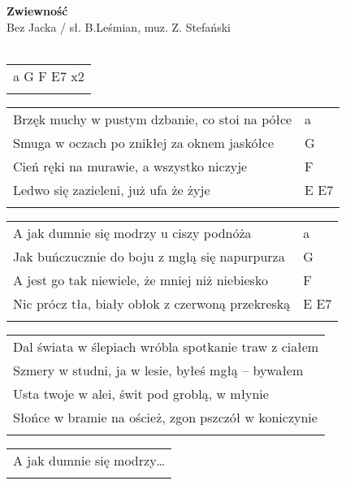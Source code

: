 \documentclass[a5paper]{article}
\begin{document}


\noindent
\fontsize{12pt}{15pt}\selectfont
\textbf{Zwiewność} \\
\fontsize{8pt}{10pt}\selectfont
Bez Jacka / sł. B.Leśmian, muz. Z. Stefański \\ \\
\fontsize{10pt}{12pt}\selectfont
{}
\begin{tabular}{@{}p{9.00cm}@{}}
\noindent
a G F E7 x2 \\ \\
\end{tabular}

\noindent
\begin{tabular}{@{}p{9.00cm}p{3cm}@{}}
Brzęk muchy w pustym dzbanie, co stoi na półce & a \\
Smuga w oczach po znikłej za oknem jaskółce & G \\
Cień ręki na murawie, a wszystko niczyje & F \\
Ledwo się zazieleni, już ufa że żyje & E E7 \\ \\
\end{tabular}

\noindent
\begin{tabular}{@{}p{8.00cm}p{3cm}@{}}
A jak dumnie się modrzy u ciszy podnóża & a \\
Jak buńczucznie do boju z mgłą się napurpurza & G \\
A jest go tak niewiele, że mniej niż niebiesko & F \\
Nic prócz tła, biały obłok z czerwoną przekreską & E E7 \\ \\
\end{tabular}

\noindent
\begin{tabular}{@{}p{9.00cm}@{}}
Dal świata w ślepiach wróbla spotkanie traw z ciałem \\
Szmery w studni, ja w lesie, byłeś mgłą – bywałem \\
Usta twoje w alei, świt pod groblą, w młynie \\
Słońce w bramie na oścież, zgon pszczół w koniczynie \\ \\
\end{tabular}

\noindent
\begin{tabular}{@{}p{8.00cm}@{}}
A jak dumnie się modrzy… \\ \\
\end{tabular}
\end{document}
